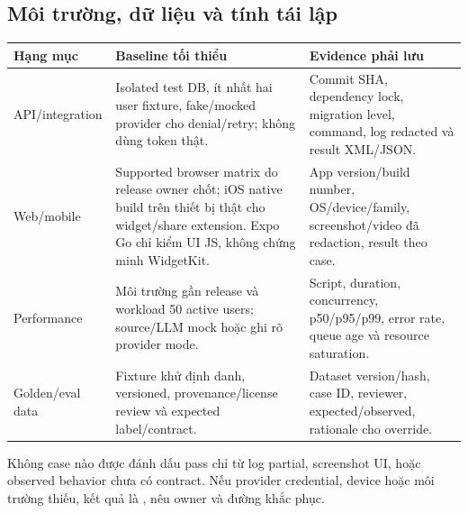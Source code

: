 \documentclass[11pt,a4paper]{article}
\begin{document}
\subsection{Môi trường, dữ liệu và tính tái lập}
\begin{longtable}{p{3.1cm}p{4.2cm}p{6cm}}
\toprule Hạng mục & Baseline tối thiểu & Evidence phải lưu \\ \midrule\endhead
API/integration & Isolated test DB, ít nhất hai user fixture, fake/mocked provider cho denial/retry; không dùng token thật. & Commit SHA, dependency lock, migration level, command, log redacted và result XML/JSON. \\
Web/mobile & Supported browser matrix do release owner chốt; iOS native build trên thiết bị thật cho widget/share extension. Expo Go chỉ kiểm UI JS, không chứng minh WidgetKit. & App version/build number, OS/device/family, screenshot/video đã redaction, result theo case. \\
Performance & Môi trường gần release và workload 50 active users; source/LLM mock hoặc ghi rõ provider mode. & Script, duration, concurrency, p50/p95/p99, error rate, queue age và resource saturation. \\
Golden/eval data & Fixture khử định danh, versioned, provenance/license review và expected label/contract. & Dataset version/hash, case ID, reviewer, expected/observed, rationale cho override. \\
\bottomrule
\end{longtable}

Không case nào được đánh dấu pass chỉ từ log partial, screenshot UI, hoặc observed behavior chưa có contract. Nếu provider credential, device hoặc môi trường thiếu, kết quả là , nêu owner và đường khắc phục.
\end{document}

